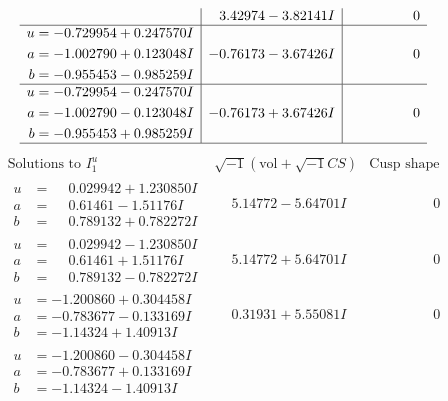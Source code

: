 \documentclass[1p]{elsarticle_modified}
\theoremstyle{definition}
\newcommand{\I}{\sqrt{-1}}
\begin{document}
$$\begin{array}{c|c|c}
 & \phantom{-}3.42974 - 3.82141 I & \phantom{-0.000000 } 0 \\ \hline\begin{aligned}
u &= -0.729954 + 0.247570 I \\
a &= -1.002790 + 0.123048 I \\
b &= -0.955453 - 0.985259 I\end{aligned}
 & -0.76173 - 3.67426 I & \phantom{-0.000000 } 0 \\ \hline\begin{aligned}
u &= -0.729954 - 0.247570 I \\
a &= -1.002790 - 0.123048 I \\
b &= -0.955453 + 0.985259 I\end{aligned}
 & -0.76173 + 3.67426 I & \phantom{-0.000000 } 0\\
 \hline 
 \end{array}$$\newpage$$\begin{array}{c|c|c}  
\text{Solutions to }I^u_{1}& \I (\text{vol} + \sqrt{-1}CS) & \text{Cusp shape}\\
 \hline 
\begin{aligned}
u &= \phantom{-}0.029942 + 1.230850 I \\
a &= \phantom{-}0.61461 - 1.51176 I \\
b &= \phantom{-}0.789132 + 0.782272 I\end{aligned}
 & \phantom{-}5.14772 - 5.64701 I & \phantom{-0.000000 } 0 \\ \hline\begin{aligned}
u &= \phantom{-}0.029942 - 1.230850 I \\
a &= \phantom{-}0.61461 + 1.51176 I \\
b &= \phantom{-}0.789132 - 0.782272 I\end{aligned}
 & \phantom{-}5.14772 + 5.64701 I & \phantom{-0.000000 } 0 \\ \hline\begin{aligned}
u &= -1.200860 + 0.304458 I \\
a &= -0.783677 - 0.133169 I \\
b &= -1.14324 + 1.40913 I\end{aligned}
 & \phantom{-}0.31931 + 5.55081 I & \phantom{-0.000000 } 0 \\ \hline\begin{aligned}
u &= -1.200860 - 0.304458 I \\
a &= -0.783677 + 0.133169 I \\
b &= -1.14324 - 1.40913 I\end{aligned}

\end{array}$$
\end{document}
